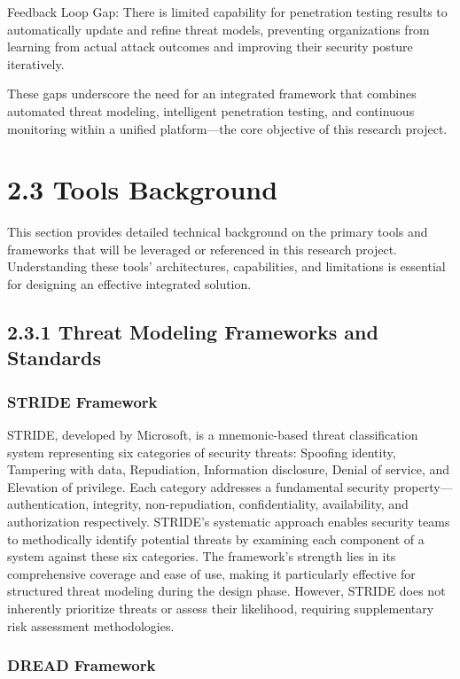 \documentclass[12pt,a4paper]{report}
\begin{document}
Feedback Loop Gap: There is limited capability for penetration testing results to automatically update and refine threat models, preventing organizations from learning from actual attack outcomes and improving their security posture iteratively.

These gaps underscore the need for an integrated framework that combines automated threat modeling, intelligent penetration testing, and continuous monitoring within a unified platform—the core objective of this research project.

\section{2.3 Tools Background}

This section provides detailed technical background on the primary tools and frameworks that will be leveraged or referenced in this research project. Understanding these tools' architectures, capabilities, and limitations is essential for designing an effective integrated solution.

\subsection{2.3.1 Threat Modeling Frameworks and Standards}

\subsubsection{STRIDE Framework}

STRIDE, developed by Microsoft, is a mnemonic-based threat classification system representing six categories of security threats: Spoofing identity, Tampering with data, Repudiation, Information disclosure, Denial of service, and Elevation of privilege. Each category addresses a fundamental security property—authentication, integrity, non-repudiation, confidentiality, availability, and authorization respectively. STRIDE's systematic approach enables security teams to methodically identify potential threats by examining each component of a system against these six categories. The framework's strength lies in its comprehensive coverage and ease of use, making it particularly effective for structured threat modeling during the design phase. However, STRIDE does not inherently prioritize threats or assess their likelihood, requiring supplementary risk assessment methodologies.

\subsubsection{DREAD Framework}
\end{document}
